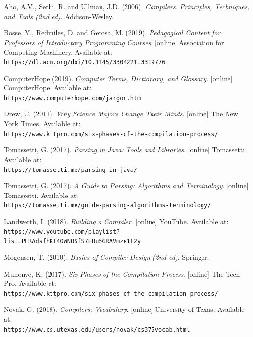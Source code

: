 \documentclass[
]{report}
\begin{document}
\begin{thebibliography}{24}
	Aho, A.V., Sethi, R. and Ullman, J.D. (2006).
	\textit{Compilers: Principles, Techniques, and Tools (2nd ed)}. 
	Addison-Wesley.
	
	Bosse, Y., Redmiles, D. and Gerosa, M. (2019).
	\textit{Pedagogical Content for Professors of Introductory Programming Courses}.
	[online] Association for Computing Machinery. Available at:
	\\\texttt{https://dl.acm.org/doi/10.1145/3304221.3319776}
	
	ComputerHope (2019).
	\textit{Computer Terms, Dictionary, and Glossary}.
	[online] ComputerHope. Available at:
	\\\texttt{https://www.computerhope.com/jargon.htm}
	
	Drew, C. (2011).
	\textit{Why Science Majors Change Their Minds}.
	[online] The New York Times. Available at:
	\\\texttt{https://www.kttpro.com/six-phases-of-the-compilation-process/}
	
	Tomassetti, G. (2017).
	\textit{Parsing in Java: Tools and Libraries}.
	[online] Tomassetti. Available at:
	\\\texttt{https://tomassetti.me/parsing-in-java/}
	
	Tomassetti, G. (2017).
	\textit{A Guide to Parsing: Algorithms and Terminology}.
	[online] Tomassetti. Available at:
	\\\texttt{https://tomassetti.me/guide-parsing-algorithms-terminology/}
	
	Landwerth, I. (2018).
	\textit{Building a Compiler}.
	[online] YouTube. Available at:
	\\\texttt{https://www.youtube.com/playlist?list=PLRAdsfhKI4OWNOSfS7EUu5GRAVmze1t2y}
	
	Mogensen, T. (2010).
	\textit{Basics of Compiler Design (2nd ed)}.
	Springer.
	
	Munonye, K. (2017).
	\textit{Six Phases of the Compilation Process}.
	[online] The Tech Pro. Available at:
	\\\texttt{https://www.kttpro.com/six-phases-of-the-compilation-process/}
	
	Novak, G. (2019).
	\textit{Compilers: Vocabulary}.
	[online] University of Texas. Available at:
	\\\texttt{https://www.cs.utexas.edu/users/novak/cs375vocab.html}
	

\end{thebibliography}
\end{document}
